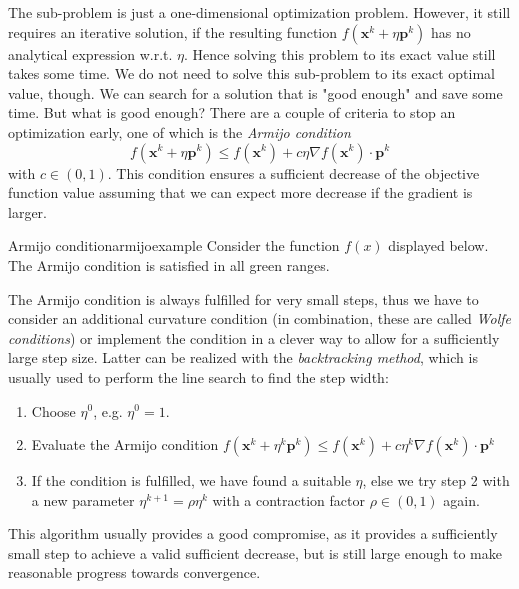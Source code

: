 The sub-problem is just a one-dimensional optimization problem. However, it still requires an iterative solution, if the resulting function $f(\mathbf{x}^k + \eta \mathbf{p}^k)$ has no analytical expression w.r.t. $\eta$. Hence solving this problem to its exact value still takes some time. We do not need to solve this sub-problem to its exact optimal value, though. We can search for a solution that is "good enough" and save some time. But what is good enough?
There are a couple of criteria to stop an optimization early, one of which is the \emph{Armijo condition} 
\begin{equation}
    f(\mathbf{x}^k + \eta \mathbf{p}^k) \le f(\mathbf{x}^k) + c \eta  \nabla f(\mathbf{x}^k) \cdot \mathbf{p}^k 
\end{equation}
with $c \in (0,1)$. This condition ensures a sufficient decrease of the objective function value assuming that we can expect more decrease if the gradient is larger. 

\begin{example}{Armijo condition}{armijoexample}
    Consider the function $f(x)$ displayed below. The Armijo condition is satisfied in all green ranges.  
    
    
\end{example}

The Armijo condition is always fulfilled for very small steps, thus we have to consider an additional curvature condition (in combination, these are called \emph{Wolfe conditions}) or implement the condition in a clever way to allow for a sufficiently large step size. Latter can be realized with the \emph{backtracking method}, which is usually used to perform the line search to find the step width: 
\begin{enumerate}
    \item Choose $\eta^0$, e.g. $\eta^0=1$.
    \item Evaluate the Armijo condition $f(\mathbf{x}^k + \eta^k \mathbf{p}^k) \le f(\mathbf{x}^k) + c \eta^k \nabla f(\mathbf{x}^k) \cdot \mathbf{p}^k $
    \item If the condition is fulfilled, we have found a suitable $\eta$, else we try step 2 with a new parameter $\eta^{k+1}=\rho \eta^k$ with a contraction factor $\rho \in (0,1)$ again.
\end{enumerate}
This algorithm usually provides a good compromise, as it provides a sufficiently small step to achieve a valid sufficient decrease, but is still large enough to make reasonable progress towards convergence.

